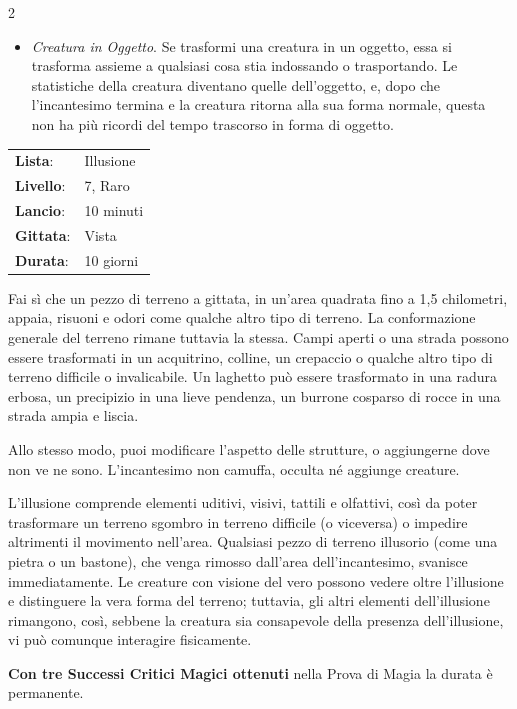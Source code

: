 \begin{multicols}{2}
\begin{itemize}[leftmargin=*]
	\item \emph{Creatura in Oggetto}. Se trasformi una creatura in un oggetto, essa si trasforma assieme a qualsiasi cosa stia indossando o trasportando. Le statistiche della creatura diventano quelle dell'oggetto, e, dopo che l'incantesimo termina e la creatura ritorna alla sua forma normale, questa non ha più ricordi del tempo trascorso in forma di oggetto.

\end{itemize}

\noindent\begin{tabularx}{\linewidth}{p{1.9cm}X}
	\rowcolor{gray!20}\textbf{Lista}: & Illusione \\
	\textbf{Livello}: & 7, Raro \\
	\rowcolor{gray!20}\textbf{Lancio}: & 10 minuti \\
	\textbf{Gittata}: & Vista \\
	\rowcolor{gray!20}\textbf{Durata}: & 10 giorni \\
\end{tabularx}\smallskip

Fai sì che un pezzo di terreno a gittata, in un'area quadrata fino a 1,5 chilometri, appaia, risuoni e odori come qualche altro tipo di terreno. La conformazione generale del terreno rimane tuttavia la stessa. Campi aperti o una strada possono essere trasformati in un acquitrino, colline, un crepaccio o qualche altro tipo di terreno difficile o invalicabile. Un laghetto può essere trasformato in una radura erbosa, un precipizio in una lieve pendenza, un burrone cosparso di rocce in una strada ampia e liscia.

Allo stesso modo, puoi modificare l'aspetto delle strutture, o aggiungerne dove non ve ne sono. L'incantesimo non camuffa, occulta né aggiunge creature.

L'illusione comprende elementi uditivi, visivi, tattili e olfattivi, così da poter trasformare un terreno sgombro in terreno difficile (o viceversa) o impedire altrimenti il movimento nell'area. Qualsiasi pezzo di terreno illusorio (come una pietra o un bastone), che venga rimosso dall'area dell'incantesimo, svanisce immediatamente. Le creature con visione del vero possono vedere oltre l'illusione e distinguere la vera forma del terreno; tuttavia, gli altri elementi dell'illusione rimangono, così, sebbene la creatura sia consapevole della presenza dell'illusione, vi può comunque interagire fisicamente.

\textbf{Con tre Successi Critici Magici ottenuti} nella Prova di Magia la durata è permanente.


\end{multicols}
